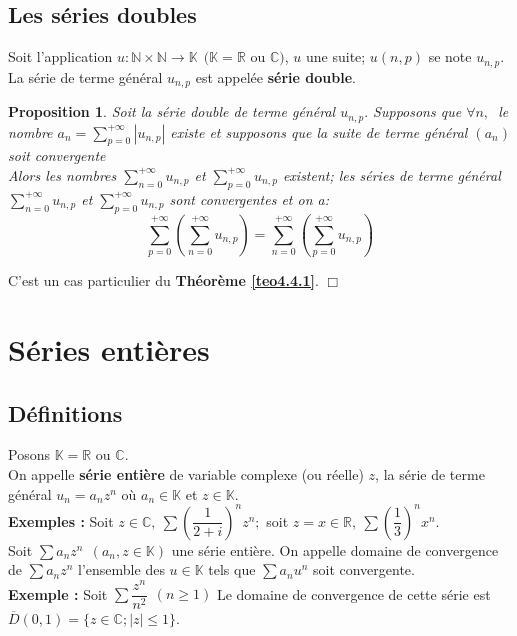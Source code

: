 \documentclass[11pt, a4paper]{book}
\newtheorem{pro}{Proposition}[section]
\newenvironment{pr}{\noindent {\bf Preuve} \noindent} {\hfill $\Box$\vskip 5mm}
\begin{document}
\section{Les s\'eries doubles }
Soit l'application $u: \mathbb{N}\times\mathbb{N}\longrightarrow\mathbb{K}~~(\mathbb{K}=\mathbb{R}$ ou $\mathbb{C})$, $u$ une suite; $u(n,p)$ se note $u_{n,p}.$ \\ La s\'erie de terme g\'en\'eral $u_{n,p}$ est appel\'ee \textbf{s\'erie double}.
\begin{pro} \label{pro4.5.1}
Soit la s\'erie double de terme g\'en\'eral $u_{n,p}.$ Supposons que $\forall n,~$ le nombre ${\displaystyle a_n=\sum_{p=0}^{+\infty}|u_{n,p}|}$ existe et supposons que la suite de terme g\'en\'eral $(a_n)$ soit convergente\\ Alors les nombres ${\displaystyle \sum_{n=0}^{+\infty}u_{n,p}}$ et ${\displaystyle\sum_{p=0}^{+\infty}u_{n,p}}$ existent; les s\'eries de terme g\'en\'eral ${\displaystyle\sum_{n=0}^{+\infty}u_{n,p}}$ et ${\displaystyle\sum_{p=0}^{+\infty}u_{n,p}}$ sont convergentes et on a: $$\sum_{p=0}^{+\infty}\left(\sum_{n=0}^{+\infty}u_{n,p}\right) =\sum_{n=0}^{+\infty} \left(\sum_{p=0}^{+\infty}u_{n,p}\right)$$
\end{pro}
\begin{pr}\quad
C'est un cas particulier du \textbf{Th\'eor\`eme \ref{teo4.4.1}}.
\end{pr}


\chapter{S\'eries enti\`eres} 
\section{D\'efinitions}
Posons $\mathbb{K}=\mathbb{R}$ ou $\mathbb{C}$.\\
On appelle \textbf{s\'erie enti\`ere} de variable complexe (ou r\'eelle) $z$, la s\'erie de terme g\'en\'eral $u_n=a_nz^n$ o\`u $a_n\in \mathbb{K}$ et $z\in \mathbb{K}.$ \\
\textbf{Exemples :}\quad
Soit $z\in\mathbb{C},~\sum\left(\dfrac{1}{2+i}\right)^n z^n;$ soit $z=x\in \mathbb{R},~\sum\left(\dfrac{1}{3}\right)^n x^n.$\\
Soit ${\displaystyle\sum a_n z^n~~(a_n,z\in \mathbb{K})}$ une s\'erie enti\`ere. On appelle domaine de convergence de ${\displaystyle\sum a_n z^n}$ l'ensemble des $u\in \mathbb{K}$ tels que $\sum a_n u^n$ soit convergente.\\
\textbf{Exemple :} Soit $\sum \dfrac{z^n}{n^2}~~(n\geq1)$ Le domaine de convergence de cette s\'erie est $\overline{D}(0,1)=\{z\in \mathbb{C};|z|\leq1\}.$
\end{document}
